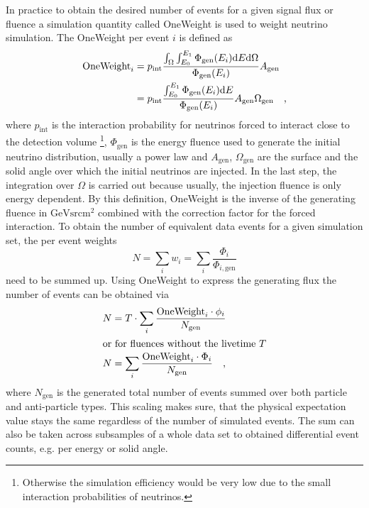 In practice to obtain the desired number of events for a given signal flux or fluence a simulation quantity called OneWeight is used to weight neutrino simulation.
The OneWeight per event $i$ is defined as 
\begin{align}
  \text{OneWeight}_i
  &= p_\text{int}\frac{\int_\Omega\int_{E_0}^{E_1}
                       \Phi_\text{gen}(E_i)\mathrm{d}E\mathrm{d}\Omega
                       }{\Phi_\text{gen}(E_i)}A_\text{gen} \\
  &= p_\text{int}\frac{\int_{E_0}^{E_1}\Phi_\text{gen}(E_i)\mathrm{d}E}
                      {\Phi_\text{gen}(E_i)}
    A_\text{gen}\Omega_\text{gen}
  \quad\text{,}
\end{align}
where $p_\text{int}$ is the interaction probability for neutrinos forced to interact close to the detection volume \footnote{Otherwise the simulation efficiency would be very low due to the small interaction probabilities of neutrinos.}, $\Phi_\text{gen}$ is the energy fluence used to generate the initial neutrino distribution, usually a power law and $A_\text{gen}$, $\Omega_\text{gen}$ are the surface and the solid angle over which the initial neutrinos are injected.
In the last step, the integration over $\Omega$ is carried out because usually, the injection fluence is only energy dependent.
By this definition, OneWeight is the inverse of the generating fluence in $\si{\GeV\steradian\cm\squared}$ combined with the correction factor for the forced interaction.
To obtain the number of equivalent data events for a given simulation set, the per event weights
\begin{equation}
  N = \sum_i w_i = \sum_i \frac{\Phi_i}{\Phi_{i,\text{gen}}}
\end{equation}
need to be summed up.
Using OneWeight to express the generating flux the number of events can be obtained via
\begin{align}
  N &= T \cdot \sum_i \frac{\text{OneWeight}_i \cdot \phi_i}{N_\text{gen}} \\
  \intertext{or for fluences without the livetime $T$}
  N &= \sum_i \frac{\text{OneWeight}_i \cdot \Phi_i}{N_\text{gen}}
  \quad\text{,}
\end{align}
where $N_\text{gen}$ is the generated total number of events summed over both particle and anti-particle types.
This scaling makes sure, that the physical expectation value stays the same regardless of the number of simulated events.
The sum can also be taken across subsamples of a whole data set to obtained differential event counts, e.g. per energy or solid angle.

